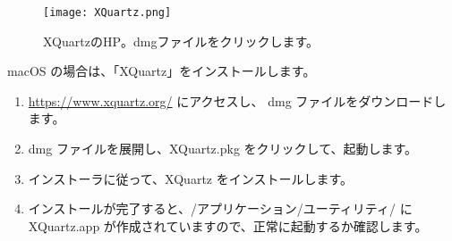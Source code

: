 \begin{figure}[h]
  \begin{center}
    \texttt{[image: XQuartz.png]}
    \caption{XQuartzのHP。dmgファイルをクリックします。}
  \end{center}
\end{figure}

macOS の場合は、「XQuartz」をインストールします。
\begin{enumerate}
  \item \url{https://www.xquartz.org/} にアクセスし、 dmg ファイルをダウンロードします。
  \item dmg ファイルを展開し、XQuartz.pkg をクリックして、起動します。
  \item インストーラに従って、XQuartz をインストールします。
  \item インストールが完了すると、/アプリケーション/ユーティリティ/ に XQuartz.app が作成されていますので、正常に起動するか確認します。
\end{enumerate}
